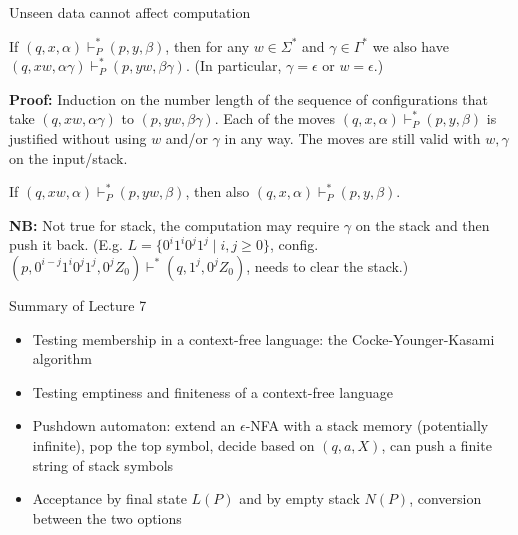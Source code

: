 \documentclass[handout]{beamer}
\begin{document}
\begin{frame}{Unseen data cannot affect computation}

    \begin{lemma}
        If $(q,x,\alpha)\vdash^*_P (p,y,\beta) $, then for any $w\in \Sigma^*$ and $\gamma\in\Gamma^*$ we also have 
        $(q,xw,\alpha\gamma)\vdash^*_P(p,yw,\beta\gamma)$. (In particular, $\gamma=\epsilon$ or $w=\epsilon$.)
    \end{lemma}
    \textbf{Proof:} Induction on the number length of the sequence of configurations that take $(q,xw,\alpha\gamma)$ to $(p,yw,\beta\gamma)$. Each of the moves $(q,x,\alpha)\vdash^*_P(p,y,\beta)$ is justified without using $w$ and/or $\gamma$ in any way. The moves are still valid with $w,\gamma$ on the input/stack.\hfill\qedsymbol

    \medskip

    \begin{lemma}
        If $(q,xw,\alpha)\vdash^*_P (p,yw,\beta) $, then also $(q,x,\alpha)\vdash^*_P(p,y,\beta)$.
    \end{lemma}
    \textbf{NB:} Not true for stack, the computation may require $\gamma$ on the stack and then push it back. (E.g. $L=\{0^i1^i0^j1^j\mid i,j\geq 0\}$, config. $(p,0^{i-j}1^i0^j1^j,0^jZ_0)\vdash^* (q,1^j,0^jZ_0)$, needs to clear the stack.)

\end{frame}


\begin{frame}{Summary of Lecture 7}
	
	\begin{itemize}    
        \item Testing membership in a context-free language: the Cocke-Younger-Kasami algorithm
        \item Testing emptiness and finiteness of a context-free language    
		\item Pushdown automaton: extend an $\epsilon$-NFA with a stack memory (potentially infinite), pop the top symbol, decide based on $(q,a,X)$, can push a finite string of stack symbols
        \item Acceptance by final state $L(P)$ and by empty stack $N(P)$, conversion between the two options        	
	\end{itemize}

\end{frame}
\end{document}
